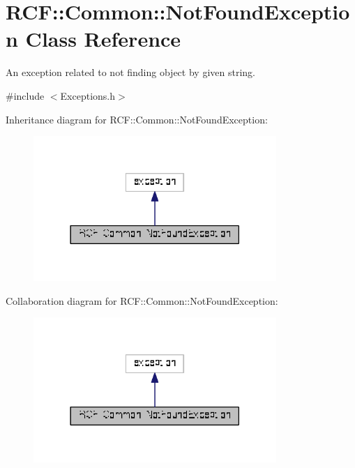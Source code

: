 \hypertarget{class_r_c_f_1_1_common_1_1_not_found_exception}{}\section{R\+C\+F\+:\+:Common\+:\+:Not\+Found\+Exception Class Reference}
\label{class_r_c_f_1_1_common_1_1_not_found_exception}


An exception related to not finding object by given string.  




{\ttfamily \#include $<$Exceptions.\+h$>$}



Inheritance diagram for R\+C\+F\+:\+:Common\+:\+:Not\+Found\+Exception\+:\nopagebreak
\begin{figure}[H]
\begin{center}
\leavevmode
\includegraphics[width=261pt]{class_r_c_f_1_1_common_1_1_not_found_exception__inherit__graph}
\end{center}
\end{figure}


Collaboration diagram for R\+C\+F\+:\+:Common\+:\+:Not\+Found\+Exception\+:\nopagebreak
\begin{figure}[H]
\begin{center}
\leavevmode
\includegraphics[width=261pt]{class_r_c_f_1_1_common_1_1_not_found_exception__coll__graph}
\end{center}
\end{figure}
